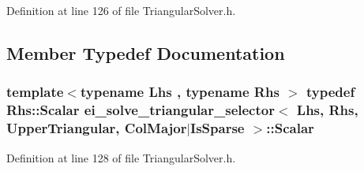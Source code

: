 Definition at line 126 of file Triangular\-Solver.\-h.



\subsection{Member Typedef Documentation}
\hypertarget{structei__solve__triangular__selector_3_01_lhs_00_01_rhs_00_01_upper_triangular_00_01_col_major_7_is_sparse_01_4_acc02044ecd44357f220c0d93d31456c9}{
\subsubsection[{Scalar}]{\setlength{\rightskip}{0pt plus 5cm}template$<$typename Lhs , typename Rhs $>$ typedef Rhs\-::\-Scalar {\bf ei\-\_\-solve\-\_\-triangular\-\_\-selector}$<$ Lhs, Rhs, {\bf Upper\-Triangular}, {\bf Col\-Major}$|${\bf Is\-Sparse} $>$\-::{\bf Scalar}}}\label{structei__solve__triangular__selector_3_01_lhs_00_01_rhs_00_01_upper_triangular_00_01_col_major_7_is_sparse_01_4_acc02044ecd44357f220c0d93d31456c9}


Definition at line 128 of file Triangular\-Solver.\-h.



